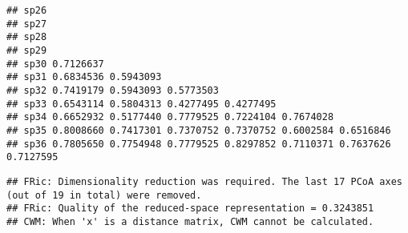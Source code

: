 \documentclass[
]{book}
\newenvironment{Shaded}{\begin{snugshade}}{\end{snugshade}}
\newcommand{\CommentTok}[1]{\textcolor[rgb]{0.56,0.35,0.01}{\textit{#1}}}
\newcommand{\KeywordTok}[1]{\textcolor[rgb]{0.13,0.29,0.53}{\textbf{#1}}}
\newcommand{\NormalTok}[1]{#1}
\newcommand{\OperatorTok}[1]{\textcolor[rgb]{0.81,0.36,0.00}{\textbf{#1}}}
\newcommand{\StringTok}[1]{\textcolor[rgb]{0.31,0.60,0.02}{#1}}
\begin{document}
\begin{verbatim}
## sp26                                                                      
## sp27                                                                      
## sp28                                                                      
## sp29                                                                      
## sp30 0.7126637                                                            
## sp31 0.6834536 0.5943093                                                  
## sp32 0.7419179 0.5943093 0.5773503                                        
## sp33 0.6543114 0.5804313 0.4277495 0.4277495                              
## sp34 0.6652932 0.5177440 0.7779525 0.7224104 0.7674028                    
## sp35 0.8008660 0.7417301 0.7370752 0.7370752 0.6002584 0.6516846          
## sp36 0.7805650 0.7754948 0.7779525 0.8297852 0.7110371 0.7637626 0.7127595
\end{verbatim}

\begin{Shaded}
\end{Shaded}

\begin{verbatim}
## FRic: Dimensionality reduction was required. The last 17 PCoA axes (out of 19 in total) were removed. 
## FRic: Quality of the reduced-space representation = 0.3243851 
## CWM: When 'x' is a distance matrix, CWM cannot be calculated.
\end{verbatim}

\begin{Shaded}
\end{Shaded}
\end{document}
